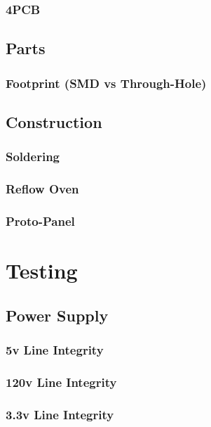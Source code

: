   \subsubsection{4PCB}
\lipsum[1]
 \subsection{Parts}
\lipsum[1]
  \subsubsection{Footprint (SMD vs Through-Hole)}
\lipsum[1]
 \subsection{Construction}
\lipsum[1]
  \subsubsection{Soldering}
\lipsum[1]
  \subsubsection{Reflow Oven}
\lipsum[1]
  \subsubsection{Proto-Panel}
\lipsum[1]
\section{Testing}
\lipsum[1]
 \subsection{Power Supply}
\lipsum[1]
  \subsubsection{5v Line Integrity}
\lipsum[1]
  \subsubsection{120v Line Integrity}
\lipsum[1]
  \subsubsection{3.3v Line Integrity}
\lipsum[1]
